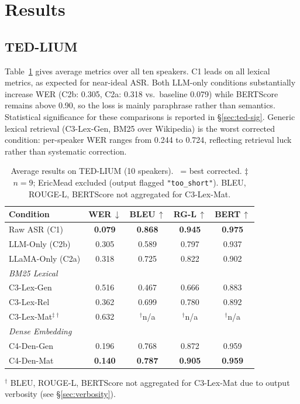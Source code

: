 \documentclass[11pt,a4paper,twocolumn]{article}
\newcommand{\up}{\textcolor{green!60!black}{$\uparrow$}}
\newcommand{\dn}{\textcolor{red!70!black}{$\downarrow$}}
\newcommand{\best}{\checkmark}
\newcommand{\bestnum}[1]{\textbf{#1}}
\begin{document}
\section{Results}

\subsection{TED-LIUM}

Table~\ref{tab:ted} gives average metrics over all ten speakers. C1 leads on
all lexical metrics, as expected for near-ideal ASR. Both LLM-only conditions
substantially increase WER (C2b: 0.305, C2a: 0.318 vs.\ baseline 0.079) while
BERTScore remains above 0.90, so the loss is mainly paraphrase rather than
semantics. Statistical significance for these comparisons is reported in
\S\ref{sec:ted-sig}. Generic lexical retrieval (C3-Lex-Gen, BM25 over Wikipedia) is the worst corrected condition: per-speaker WER ranges from 0.244 to 0.724, reflecting retrieval luck rather than systematic correction.

\begin{table}[t]
\centering
\caption{Average results on TED-LIUM (10 speakers). \best\ = best
corrected. $\ddagger$ $n{=}9$; EricMead excluded (output flagged
\texttt{"too\_short"}). BLEU, ROUGE-L, BERTScore not aggregated for C3-Lex-Mat.}
\label{tab:ted}
\small
\setlength{\tabcolsep}{4pt}
\renewcommand{\arraystretch}{1.15}
\begin{tabular}{lcccc}
\toprule
\textbf{Condition} & \textbf{WER\,\dn} & \textbf{BLEU\,\up} & \textbf{RG-L\,\up} & \textbf{BERT\,\up} \\
\midrule
Raw ASR (C1)      & \bestnum{0.079} & \bestnum{0.868} & \bestnum{0.945} & \bestnum{0.975} \\
LLM-Only (C2b)    & 0.305        & 0.589        & 0.797        & 0.937 \\
LLaMA-Only (C2a)  & 0.318        & 0.725        & 0.822        & 0.902 \\
\midrule
\multicolumn{5}{l}{\small\textit{BM25 Lexical}} \\
C3-Lex-Gen        & 0.516        & 0.467        & 0.666        & 0.883 \\
C3-Lex-Rel        & 0.362        & 0.699        & 0.780        & 0.892 \\
C3-Lex-Mat$^{\ddagger\dag}$ & 0.632 & $^\dag$n/a & $^\dag$n/a & $^\dag$n/a \\
\midrule
\multicolumn{5}{l}{\small\textit{Dense Embedding}} \\
C4-Den-Gen        & 0.196        & 0.768        & 0.872        & 0.959 \\
C4-Den-Mat~\best & \bestnum{0.140} & \bestnum{0.787} & \bestnum{0.905} & \bestnum{0.959} \\
\bottomrule
\end{tabular}
\vspace{4pt}
\par\noindent\footnotesize$^\dag$ BLEU, ROUGE-L, BERTScore not aggregated for
C3-Lex-Mat due to output verbosity (see \S\ref{sec:verbosity}).
\end{table}
\end{document}

